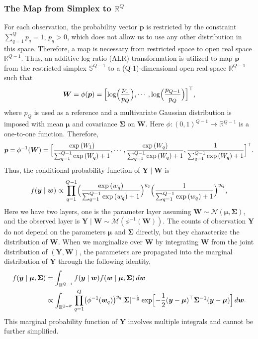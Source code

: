 \documentclass[]{report}
\theoremstyle{definition}
\begin{document}
\subsubsection{The Map from Simplex to $\mathbb{R}^{Q}$}
For each observation, the probability vector $\boldsymbol{p}$ is restricted by the constraint $\sum_{q=1}^{Q}p_{q}=1$, $p_{q}>0$, which does not allow us to use any other distribution in this space. Therefore, a map is necessary from restricted space to open real space $\mathbb{R}^{Q-1}$. Thus, an additive log-ratio (ALR) transformation is utilized to map $\boldsymbol{p}$ from the restricted simplex $\mathbb{S}^{Q-1}$ to a (Q-1)-dimensional open real space $\mathbb{R}^{Q-1}$ such that
\begin{equation}
\boldsymbol{W}=\phi(\boldsymbol{p})=\Bigl[\log \Bigl(\dfrac{p_{1}}{p_{Q}}\Bigr),\cdots , \log \Bigl(\dfrac{p_{Q-1}}{p_{Q}}\Bigr)\Bigr]^{\top},
\end{equation}
where $p_{Q}$ is used as a reference and a multivariate Gaussian distribution is imposed with mean $\boldsymbol{\mu}$ and covariance $\boldsymbol{\Sigma}$ on $\boldsymbol{W}$. Here $\phi: (0,1)^{Q-1} \to \mathbb{R}^{Q-1}$ is a one-to-one function. Therefore,
\begin{equation}
\boldsymbol{p}=\phi^{-1}(\boldsymbol{W})=\Bigl[ \dfrac{\exp{(W_{1})}}{\sum_{q=1}^{Q-1}\exp{(W_{q})}+1},\cdots , \dfrac{\exp{(W_{q})}}{\sum_{q=1}^{Q-1}\exp{(W_{q})}+1}, \dfrac{1}{\sum_{q=1}^{Q-1}\exp{(W_{q})}+1}\Bigr]^{\top}.
\end{equation}
Thus, the conditional probability function of $\boldsymbol{Y}\mid \boldsymbol{W}$ is 
\begin{equation}
f(\boldsymbol{y}\mid \boldsymbol{w}) \propto \prod_{q=1}^{Q-1}\Bigl(\dfrac{\exp{(w_{q})}}{\sum_{q=1}^{Q-1}\exp{(w_{q})}+1}\Bigr)^{y_{q}} \Bigl(\dfrac{1}{\sum_{q=1}^{Q-1}\exp{(w_{q})}+1}\Bigr)^{y_{Q}},
\end{equation}
Here we have two layers, one is the parameter layer assuming $\boldsymbol{W}\sim \mathcal{N}(\boldsymbol{\mu}, \boldsymbol{\Sigma})$, and the observed layer is  $\boldsymbol{Y}\mid \boldsymbol{W}\sim \mathcal{M}(\phi^{-1}(\boldsymbol{W}))$. The counts of observation $\boldsymbol{Y}$ do not depend on the parameters $\boldsymbol{\mu}$ and $\boldsymbol{\Sigma}$ directly, but they characterize the distribution of $\boldsymbol{W}$. When we marginalize over $\boldsymbol{W}$ by integrating $\boldsymbol{W}$ from the joint distribution of $(\boldsymbol{Y},\boldsymbol{W})$, the parameters are propagated into the marginal distribution of $\boldsymbol{Y}$ through the following identity,    
\begin{align}
f(\boldsymbol{y}\mid \boldsymbol{\mu}, \boldsymbol{\Sigma})&=\int_{\mathbb{R}^{Q-1}} f(\boldsymbol{y}\mid \boldsymbol{w}) f(\boldsymbol{w}\mid \boldsymbol{\mu}, \boldsymbol{\Sigma})\,d\boldsymbol{w}\\
&\propto \int_{\mathbb{R^{Q-1}}} \prod_{q=1}^{Q} \bigl(\phi^{-1}(\boldsymbol{w}_{q})\bigr)^{y_{q}}  |\boldsymbol{\Sigma}|^{-\frac{1}{2}}\exp\Bigl[-\dfrac{1}{2}(\boldsymbol{y}-\boldsymbol{\mu})^{\top}\boldsymbol{\Sigma}^{-1}(\boldsymbol{y}-\boldsymbol{\mu})\Bigr]\,d\boldsymbol{w}.
\end{align}
This marginal probability function of $\boldsymbol{Y}$ involves multiple integrals and cannot be further simplified.
\end{document}
